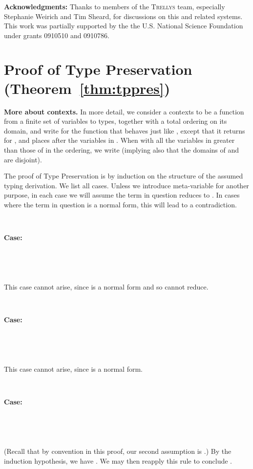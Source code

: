 \documentclass[copyright]{eptcs}
\begin{document}
\textbf{Acknowledgments:} Thanks to members of the \textsc{Trellys}
team, especially Stephanie Weirich and Tim Sheard, for discussions on
this and related systems.  This work was partially supported by the
the U.S. National Science Foundation under grants 0910510 and 0910786.




\ifTR
\appendix

\section{Proof of Type Preservation (Theorem~\ref{thm:tppres})}

\textbf{More about contexts.}  In more detail, we consider a contexts
 to be a function from a finite set of variables to types,
together with a total ordering on its domain, and write
 for the function that behaves just like ,
except that it returns  for , and places  after the
variables in .  When
 with all the variables in
 greater than those of  in the ordering, we write
 (implying also that the domains of  and
 are disjoint).

The proof of Type Preservation is by induction on the structure of the
assumed typing derivation.  We list all cases.  Unless we introduce
meta-variable  for another purpose, in each case we will assume the
term in question reduces to .  In cases where the term in question
is a normal form, this will lead to a contradiction.

\ 

\noindent \textbf{Case:}

\



\ 

\noindent This case cannot arise, since  is a normal form and so
cannot reduce.

\ 

\noindent \textbf{Case:}

\



\ 

\noindent This case cannot arise, since  is a normal form.

\ 

\noindent \textbf{Case:}

\



\ 

\noindent (Recall that by convention in this proof, our second
assumption is .)  By the induction hypothesis, we have
.  We may then reapply this rule to
conclude .
\end{document}
